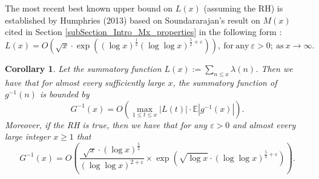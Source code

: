\documentclass[11pt,reqno,a4letter]{article}
\numberwithin{figure}{section}
\numberwithin{table}{section}
\theoremstyle{plain}
\newtheorem{cor}[theorem]{Corollary}
\numberwithin{theorem}{section}
\theoremstyle{definition}
\begin{document}
The most recent best known upper bound on $L(x)$ (assuming the RH) is established by 
Humphries (2013) based on Soundararajan's result on $M(x)$ cited in 
Section \ref{subSection_Intro_Mx_properties} 
in the following form \cite{HUMPHRIES-JNT-2013}: 
\begin{equation} 
\label{eqn_LxBigOhAsymptotics_Humphries_v1}
L(x) = O\left(\sqrt{x} \cdot \exp\left( (\log x)^{\frac{1}{2}} 
     (\log\log x)^{\frac{5}{2} + \varepsilon}\right)\right), 
     \mathrm{\ for\ any\ } \varepsilon > 0; 
     \mathrm{\ as\ } x \rightarrow \infty.
\end{equation}

\begin{cor} 
\label{cor_ExprForGInvxByLx_v1} 
Let the summatory function $L(x) := \sum_{n \leq x} \lambda(n)$. Then we have that for 
almost every sufficiently large $x$, the summatory function of $g^{-1}(n)$ is bounded by 
$$G^{-1}(x) = O\left(\max_{1 \leq t \leq x} |L(t)| \cdot \mathbb{E}|g^{-1}(x)|\right).$$ 
Moreover, if the RH is true, then 
we have that for any $\varepsilon > 0$ and almost every large integer $x \geq 1$ that 
\[
G^{-1}(x) = O\left( 
     \frac{\sqrt{x} \cdot (\log x)^{\frac{5}{2}}}{(\log\log x)^{2 + \varepsilon}} \times 
     \exp\left(\sqrt{\log x} \cdot (\log\log x)^{\frac{5}{2} + \varepsilon}\right) 
     \right). 
\]
\end{cor} 
\end{document}
